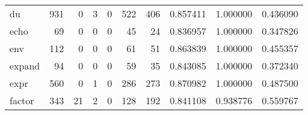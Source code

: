 \begin{tabular}{lrrrrrrrrr}
du        &                                   931 &                                                  0 &                                                  3 &                                                  0 &                                                522 &                                                406 &                                           0.857411 &                               1.000000 &                             0.436090 \\
echo      &                                    69 &                                                  0 &                                                  0 &                                                  0 &                                                 45 &                                                 24 &                                           0.836957 &                               1.000000 &                             0.347826 \\
env       &                                   112 &                                                  0 &                                                  0 &                                                  0 &                                                 61 &                                                 51 &                                           0.863839 &                               1.000000 &                             0.455357 \\
expand    &                                    94 &                                                  0 &                                                  0 &                                                  0 &                                                 59 &                                                 35 &                                           0.843085 &                               1.000000 &                             0.372340 \\
expr      &                                   560 &                                                  0 &                                                  1 &                                                  0 &                                                286 &                                                273 &                                           0.870982 &                               1.000000 &                             0.487500 \\
factor    &                                   343 &                                                 21 &                                                  2 &                                                  0 &                                                128 &                                                192 &                                           0.841108 &                               0.938776 &                             0.559767 \\

\end{tabular}
